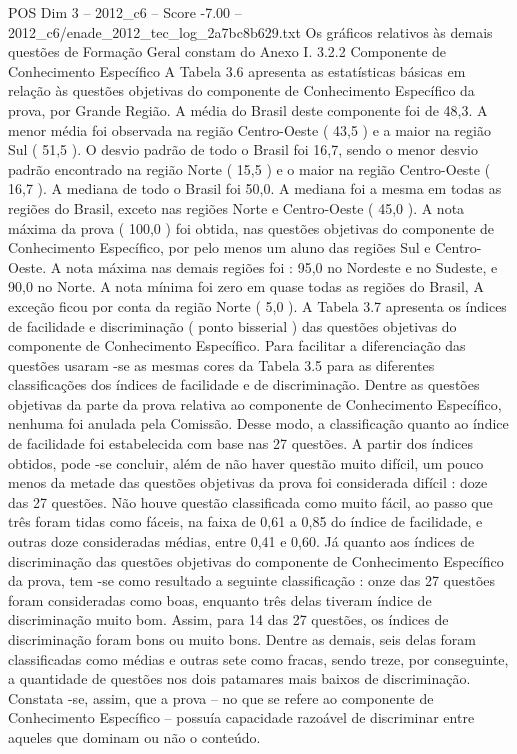 \begin{textsample}{POS Dim 3 – 2012\_c6 – Score -7.00 – 2012\_c6/enade\_2012\_tec\_log\_2a7bc8b629.txt}
Os gráficos relativos às demais questões de Formação Geral constam do Anexo I. 3.2.2 Componente de Conhecimento Específico A Tabela 3.6 apresenta as estatísticas básicas em relação às questões objetivas do componente de Conhecimento Específico da prova, por Grande Região.
A média do Brasil deste componente foi de 48,3.
A menor média foi observada na região Centro-Oeste ( 43,5 ) e a maior na região Sul ( 51,5 ).
O desvio padrão de todo o Brasil foi 16,7, sendo o menor desvio padrão encontrado na região Norte ( 15,5 ) e o maior na região Centro-Oeste ( 16,7 ).
A mediana de todo o Brasil foi 50,0.
A mediana foi a mesma em todas as regiões do Brasil, exceto nas regiões Norte e Centro-Oeste ( 45,0 ).
A nota máxima da prova ( 100,0 ) foi obtida, nas questões objetivas do componente de Conhecimento Específico, por pelo menos um aluno das regiões Sul e Centro-Oeste.
A nota máxima nas demais regiões foi : 95,0 no Nordeste e no Sudeste, e 90,0 no Norte.
A nota mínima foi zero em quase todas as regiões do Brasil, A exceção ficou por conta da região Norte ( 5,0 ).
A Tabela 3.7 apresenta os índices de facilidade e discriminação ( ponto bisserial ) das questões objetivas do componente de Conhecimento Específico.
Para facilitar a diferenciação das questões usaram -se as mesmas cores da Tabela 3.5 para as diferentes classificações dos índices de facilidade e de discriminação.
Dentre as questões objetivas da parte da prova relativa ao componente de Conhecimento Específico, nenhuma foi anulada pela Comissão.
Desse modo, a classificação quanto ao índice de facilidade foi estabelecida com base nas 27 questões.
A partir dos índices obtidos, pode -se concluir, além de não haver questão muito difícil, um pouco menos da metade das questões objetivas da prova foi considerada difícil : doze das 27 questões.
Não houve questão classificada como muito fácil, ao passo que três foram tidas como fáceis, na faixa de 0,61 a 0,85 do índice de facilidade, e outras doze consideradas médias, entre 0,41 e 0,60.
Já quanto aos índices de discriminação das questões objetivas do componente de Conhecimento Específico da prova, tem -se como resultado a seguinte classificação : onze das 27 questões foram consideradas como boas, enquanto três delas tiveram índice de discriminação muito bom.
Assim, para 14 das 27 questões, os índices de discriminação foram bons ou muito bons.
Dentre as demais, seis delas foram classificadas como médias e outras sete como fracas, sendo treze, por conseguinte, a quantidade de questões nos dois patamares mais baixos de discriminação.
Constata -se, assim, que a prova – no que se refere ao componente de Conhecimento Específico – possuía capacidade razoável de discriminar entre aqueles que dominam ou não o conteúdo.

\end{textsample}
